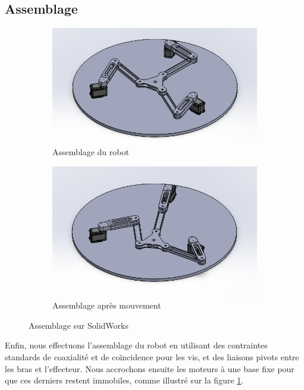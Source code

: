 \documentclass[a4paper, 11pt]{report}
\begin{document}
\subsection{Assemblage}

\begin{figure}[!tbh]
    \centering
    \begin{subfigure}[t]{0.48\textwidth}
        \centering
        \includegraphics[width=\textwidth]{Figures/assemblage_1.png}
        \caption{Assemblage du robot}
    \end{subfigure}
    \hfill
    \begin{subfigure}[t]{0.48\textwidth}
        \centering
        \includegraphics[width=\textwidth]{Figures/assemblage_2.png}
        \caption{Assemblage après mouvement}
    \end{subfigure}
    \caption{Assemblage sur SolidWorks}
    \label{fig:assemblage}
\end{figure}

Enfin, nous effectuons l'assemblage du robot en utilisant des contraintes standards de coaxialité et de coïncidence pour les vis, et des liaisons pivots entre les bras et l'effecteur. Nous accrochons ensuite les moteurs à une base fixe pour que ces derniers restent immobiles, comme illustré sur la figure \ref{fig:assemblage}.
\end{document}
